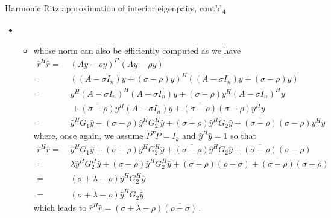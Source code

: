 \documentclass[t,usepdftitle=false]{beamer}
\begin{document}
\begin{frame}{Harmonic Ritz approximation of interior eigenpairs, cont'd\textsubscript{4}}
	\begin{itemize}
	\item[]
	\begin{itemize}\normalsize
	\item[] whose norm can also be efficiently computed as we have
	\begin{align*}
		\hat{r}^H\hat{r}
		=&\;(Ay-\rho y)^H(Ay-\rho y)\\
		=&\;((A-\sigma I_n)y+(\sigma-\rho)y)^H((A-\sigma I_n)y+(\sigma-\rho)y)\\
		=&\;y^H(A-\sigma I_n)^H(A-\sigma I_n)y+(\sigma-\rho)y^H(A-\sigma I_n)^Hy\\
		&\;+\overline{(\sigma-\rho)}y^H(A-\sigma I_n)y+\overline{(\sigma-\rho)}(\sigma-\rho)y^Hy\\
		=&\;\hat{y}^HG_1\hat{y}+(\sigma-\rho)\hat{y}^HG_2^H\hat{y}+\overline{(\sigma-\rho)}\hat{y}^HG_2\hat{y}+\overline{(\sigma-\rho)}(\sigma-\rho)y^Hy
	\end{align*}
	where, once again, we assume $P^TP=I_k$ and $\hat{y}^H\hat{y}=1$ so that
	\begin{align*}
	\hat{r}^H\hat{r}
	=&\;\hat{y}^HG_1\hat{y}+(\sigma-\rho)\hat{y}^HG_2^H\hat{y}+\overline{(\sigma-\rho)}\hat{y}^HG_2\hat{y}+\overline{(\sigma-\rho)}(\sigma-\rho)\\
	=&\;\lambda\hat{y}^HG_2^H\hat{y}+(\sigma-\rho)\hat{y}^HG_2^H\hat{y}+\overline{(\sigma-\rho)}(\rho-\sigma)+\overline{(\sigma-\rho)}(\sigma-\rho)\\
	=&\;(\sigma+\lambda-\rho)\hat{y}^HG_2^H\hat{y}\\
	=&\;(\sigma+\lambda-\rho)\overline{\hat{y}^HG_2\hat{y}}
	\end{align*}
	which leads to $\boxed{\hat{r}^H\hat{r}=(\sigma+\lambda-\rho)\overline{(\rho-\sigma)}}\,$.
	\end{itemize}
	\end{itemize}
\end{frame}
\end{document}
